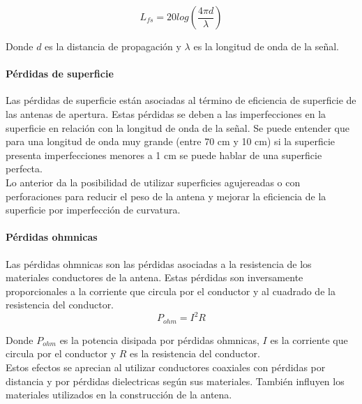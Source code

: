 \begin{equation}
    L_{fs} = 20log\left(\frac{4\pi d}{\lambda}\right)
\end{equation}

Donde $d$ es la distancia de propagación y $\lambda$ es la longitud de onda de la señal.\\

\paragraph{Pérdidas de superficie}

Las pérdidas de superficie están asociadas al término de eficiencia de superficie de las antenas de apertura. Estas pérdidas se deben a las imperfecciones en la superficie en relación con la longitud de onda de la señal. Se puede entender que para una longitud de onda muy grande (entre 70 cm y 10 cm) si la superficie presenta imperfecciones menores a 1 cm se puede hablar de una superficie perfecta.\\

Lo anterior da la posibilidad de utilizar superficies agujereadas o con perforaciones para reducir el peso de la antena y mejorar la eficiencia de la superficie por imperfección de curvatura.\\

\paragraph{Pérdidas ohmnicas}

Las pérdidas ohmnicas son las pérdidas asociadas a la resistencia de los materiales conductores de la antena. Estas pérdidas son inversamente proporcionales a la corriente que circula por el conductor y al cuadrado de la resistencia del conductor.\\

\begin{equation}
    P_{ohm} = I^{2}R
\end{equation}

Donde $P_{ohm}$ es la potencia disipada por pérdidas ohmnicas, $I$ es la corriente que circula por el conductor y $R$ es la resistencia del conductor.\\

Estos efectos se aprecian al utilizar conductores coaxiales con pérdidas por distancia y por pérdidas dielectricas según sus materiales. También influyen los materiales utilizados en la construcción de la antena.\\

